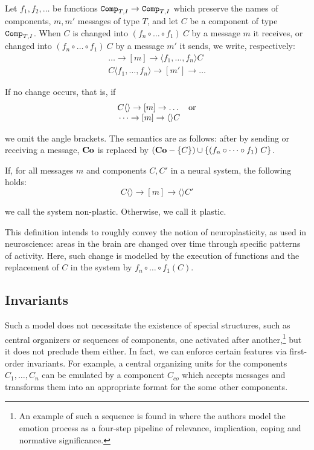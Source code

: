 \begin{definition}
	Let $f_1,f_2,\dots$ be functions $\texttt{Comp}_{T,I} \rightarrow \texttt{Comp}_{T,I}$ which preserve the names of components, $m,m'$ messages of type $T$, and let $C$ be a component of type $\texttt{Comp}_{T,I}$. When $C$ is changed into $(f_n \circ \dots \circ f_1)\ C$ by a message $m$ it receives, or changed into $(f_n \circ \dots \circ f_1)\ C$ by a message $m'$ it sends, we write, respectively:
	$$
	\begin{array}{c}
	\dots \rightarrow [m] \rightarrow \langle f_1,\dots,f_n \rangle C\\
	C\langle f_1,\dots,f_n \rangle \rightarrow [m'] \rightarrow \dots
	\end{array}
	$$
	
	\noindent
	If no change occurs, that is, if
	$$
	\begin{array}{r l}
	C\langle\rangle \rightarrow [m] \rightarrow \dots & \textnormal{or}\\
	\dots \rightarrow [m] \rightarrow \langle\rangle C
	\end{array}
	$$
	
	\noindent
	we omit the angle brackets.
	The semantics are as follows: after by sending or receiving a message, $\mathbf{Co}$ is replaced by $(\mathbf{Co} - \{C\}) \cup \{(f_n \circ \dots \circ f_1)\ C \}$.
\end{definition}

\begin{definition}
	If, for all messages $m$ and components $C, C'$ in a neural system, the following holds:
	$$
	C\langle\rangle \rightarrow [m] \rightarrow \langle\rangle C'
	$$
	
	\noindent
	we call the system non-plastic. Otherwise, we call it plastic.
\end{definition}


This definition intends to roughly convey the notion of neuroplasticity, as used in neuroscience: areas in the brain are changed over time through specific patterns of activity. Here, such change is modelled by the execution of functions and the replacement of $C$ in the system by $f_n \circ \dots \circ f_1 (C)$.

\subsection{Invariants}

Such a model does not necessitate the existence of special structures, such as central organizers or sequences of components, one activated after another,\footnote{An example of such a sequence is found in \cite{DBLP:journals/nn/SanderGS05} where the authors model the emotion process as a four-step pipeline of relevance, implication, coping and normative significance.} but it does not preclude them either. In fact, we can enforce certain features via first-order invariants. For example, a central organizing units for the components $C_1,\dots,C_n$ can be emulated by a component $C_{co}$ which accepts messages and transforms them into an appropriate format for the some other components.

